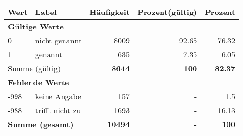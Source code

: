      \begin{longtable}{lXrrr}
     \toprule
     \textbf{Wert} & \textbf{Label} & \textbf{Häufigkeit} & \textbf{Prozent(gültig)} & \textbf{Prozent} \\
     \endhead
     \midrule
     \multicolumn{5}{l}{\textbf{Gültige Werte}}\\

     0 &
     \multicolumn{1}{X}{ nicht genannt   } &


       \num{8009} &
       \num[round-mode=places,round-precision=2]{92.65} &
         \num[round-mode=places,round-precision=2]{76.32} \\

     1 &
     \multicolumn{1}{X}{ genannt   } &


       \num{635} &
       \num[round-mode=places,round-precision=2]{7.35} &
         \num[round-mode=places,round-precision=2]{6.05} \\
     \midrule
     \multicolumn{2}{l}{Summe (gültig)} &
       \textbf{\num{8644}} &
     \textbf{\num{100}} &
       \textbf{\num[round-mode=places,round-precision=2]{82.37}} \\
     \multicolumn{5}{l}{\textbf{Fehlende Werte}}\\
       -998 &
       keine Angabe &
         \num{157} &
        - &
         \num[round-mode=places,round-precision=2]{1.5} \\
       -988 &
       trifft nicht zu &
         \num{1693} &
        - &
         \num[round-mode=places,round-precision=2]{16.13} \\
     \midrule
     \multicolumn{2}{l}{\textbf{Summe (gesamt)}} &
          \textbf{\num{10494}} &
        \textbf{-} &
        \textbf{\num{100}} \\
     \bottomrule
     \end{longtable}
     
